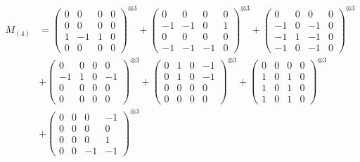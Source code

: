 \documentclass{article}
\newcommand{\Mthree}{%
    M_{(4)}
}
\begin{document}
        \newpage
        
        \footnotesize{
        \begin{align}
        \Mthree
        &= \label{Rs16-Rc11-Solution-28-c1} \begin{pmatrix} 0 & 0 & 0 & 0 \\ 0 & 0 & 0 & 0 \\ 1 & -1 & 1 & 0 \\ 0 & 0 & 0 & 0 \end{pmatrix}^{\otimes 3} 
            + \begin{pmatrix} 0 & 0 & 0 & 0 \\ -1 & -1 & 0 & 1 \\ 0 & 0 & 0 & 0 \\ -1 & -1 & -1 & 0 \end{pmatrix}^{\otimes 3} 
            + \begin{pmatrix} 0 & 0 & 0 & 0 \\ -1 & 0 & -1 & 0 \\ -1 & 1 & -1 & 0 \\ -1 & 0 & -1 & 0 \end{pmatrix}^{\otimes 3} \\
        &+ \label{Rs16-Rc11-Solution-28-c4} \begin{pmatrix} 0 & 0 & 0 & 0 \\ -1 & 1 & 0 & -1 \\ 0 & 0 & 0 & 0 \\ 0 & 0 & 0 & 0 \end{pmatrix}^{\otimes 3} 
            + \begin{pmatrix} 0 & 1 & 0 & -1 \\ 0 & 1 & 0 & -1 \\ 0 & 0 & 0 & 0 \\ 0 & 0 & 0 & 0 \end{pmatrix}^{\otimes 3} 
            + \begin{pmatrix} 0 & 0 & 0 & 0 \\ 1 & 0 & 1 & 0 \\ 1 & 0 & 1 & 0 \\ 1 & 0 & 1 & 0 \end{pmatrix}^{\otimes 3} \\
        &+ \label{Rs16-Rc11-Solution-28-c7} \begin{pmatrix} 0 & 0 & 0 & -1 \\ 0 & 0 & 0 & 0 \\ 0 & 0 & 0 & 1 \\ 0 & 0 & -1 & -1 \end{pmatrix}^{\otimes 3} 

\end{align}}
\end{document}
